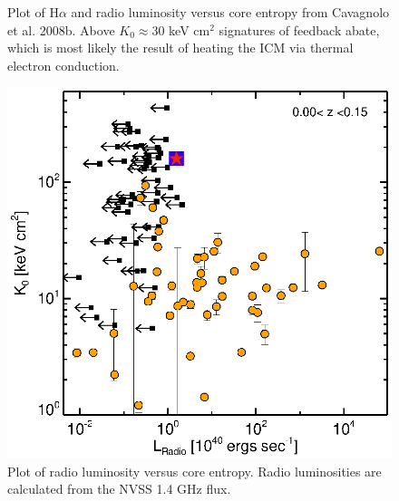 \documentclass[letterpaper,11pt]{article}
\begin{document}
\begin{figure}[t]
\begin{minipage}[t]{0.5\linewidth}
        \caption{\small
	Plot of H$\alpha$ and radio luminosity versus core entropy from
	Cavagnolo et al. 2008b. Above $K_0 \approx 30$ keV cm$^2$ signatures
	of feedback abate, which is most likely the result of heating the ICM
	via thermal electron conduction.}
        \label{fig:ha}
    \end{minipage}
    \hspace{0.25cm}
    \begin{minipage}[t]{0.5\linewidth}
        \centering
        \includegraphics*[width=\textwidth, trim=22mm 8mm 30mm 15mm, clip]{k0rad}
        \caption{\small
	Plot of radio luminosity versus core entropy. Radio
	luminosities are calculated from the NVSS 1.4 GHz flux.
	}
        \label{fig:rad}
    \end{minipage}
    \hspace{0.25cm}
    \begin{minipage}[t]{0.5\linewidth}

\end{minipage}
\end{figure}
\end{document}
